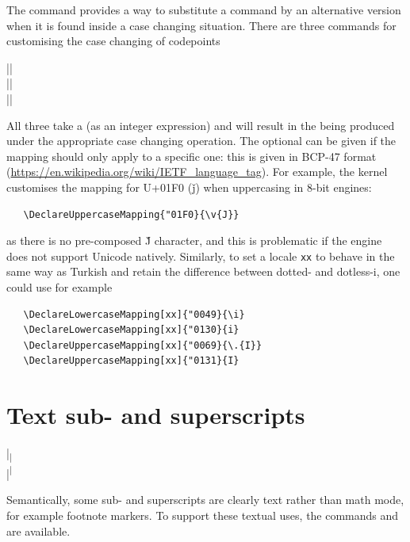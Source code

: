 \documentclass{ltxguide}
\begin{document}
The command  provides a way to substitute a
command by an alternative version when it is found inside a case changing
situation. There are three commands for customising the case changing of
codepoints
\begin{decl}
  |\DeclareLowercaseMapping|    \\
  |\DeclareTitlecaseMapping|    \\
  |\DeclareUppercaseMapping|   
\end{decl}
All three take a  (as an integer expression) and will
result in the  being produced under the appropriate case changing
operation. The optional  can be given if the mapping should only
apply to a specific one: this is given in BCP-47 format
(\url{https://en.wikipedia.org/wiki/IETF_language_tag}). For example,
the kernel customises the mapping for U+01F0 (\v{j}) when uppercasing in
8-bit engines:
\begin{verbatim}
   \DeclareUppercaseMapping{"01F0}{\v{J}}
\end{verbatim}
as there is no pre-composed \v{J} character, and this is problematic if
the engine does not support Unicode natively. Similarly, to set a locale
\texttt{xx} to behave in the same way as Turkish and retain the difference
between dotted- and dotless-i, one could use for example
\begin{verbatim}
   \DeclareLowercaseMapping[xx]{"0049}{\i}
   \DeclareLowercaseMapping[xx]{"0130}{i}
   \DeclareUppercaseMapping[xx]{"0069}{\.{I}}
   \DeclareUppercaseMapping[xx]{"0131}{I}
\end{verbatim}

\section{Text sub- and superscripts}

\begin{decl}
  |\textsubscript|  \\
  |\textsuperscript| 
\end{decl}
Semantically, some sub- and superscripts are clearly text rather than math
mode, for example footnote markers. To support these textual uses, the commands
 and  are available.
\end{document}
